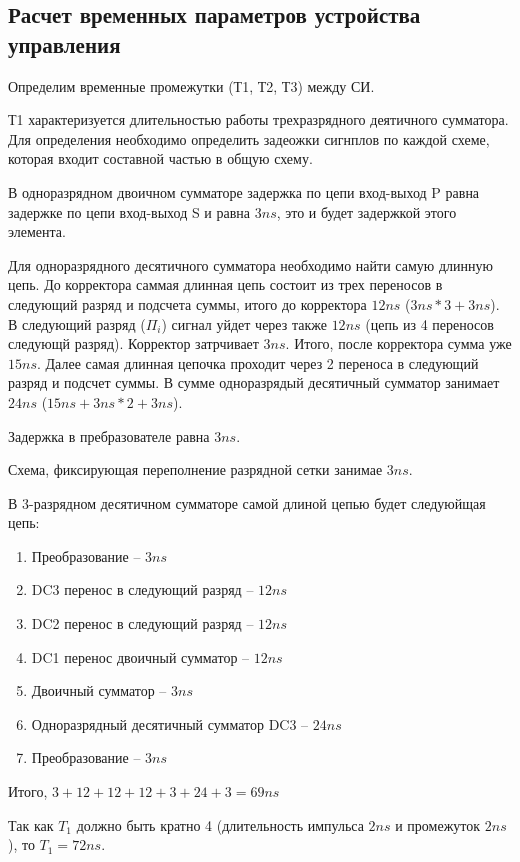 \documentclass[a4paper,14pt]{article}
\begin{document}
\subsection{Расчет временных параметров устройства управления}

Определим временные промежутки (Т1, Т2, Т3) между СИ.

Т1 характеризуется длительностью работы трехразрядного деятичного сумматора.
Для определения необходимо определить задеожки сигнплов по каждой схеме, которая входит составной частью в общую схему.

В одноразрядном двоичном сумматоре задержка по цепи вход-выход P равна задержке по цепи вход-выход S и равна $3ns$, это и будет задержкой этого элемента.

Для одноразрядного десятичного сумматора необходимо найти самую длинную цепь. До корректора саммая длинная цепь состоит из трех переносов в следующий разряд и подсчета суммы, итого до корректора $12ns$ ($3ns * 3 + 3ns$).
В следующий разряд ($\Pi_i$) сигнал уйдет через также $12ns$ (цепь из 4 переносов следующй разряд).
Корректор затрчивает $3ns$. Итого, после корректора сумма уже $15ns$.
Далее самая длинная цепочка проходит через 2 переноса в следующий разряд и подсчет суммы.
В сумме одноразрядый десятичный сумматор занимает $24ns$ ($15ns + 3ns * 2 + 3 ns$).

Задержка в пребразователе равна $3ns$.

Схема, фиксирующая переполнение разрядной сетки занимае  $3ns$.

В 3-разрядном десятичном сумматоре самой длиной цепью будет следуюйщая цепь:
\begin{enumerate}
	\item Преобразование -- $3ns$
	\item DC3 перенос в следующий разряд -- $12ns$
	\item DC2 перенос в следующий разряд -- $12ns$
	\item DC1 перенос двоичный сумматор -- $12ns$
	\item Двоичный сумматор -- $3ns$
	\item Одноразрядный десятичный сумматор DC3 -- $24ns$
	\item Преобразование -- $3ns$
\end{enumerate}

Итого, $3 + 12 + 12 + 12 + 3 + 24 + 3 = 69ns$

Так как $T_1$ должно быть кратно 4 (длительность  импульса $2ns$ и промежуток $2ns$), то $T_1 = 72ns$.
\end{document}
